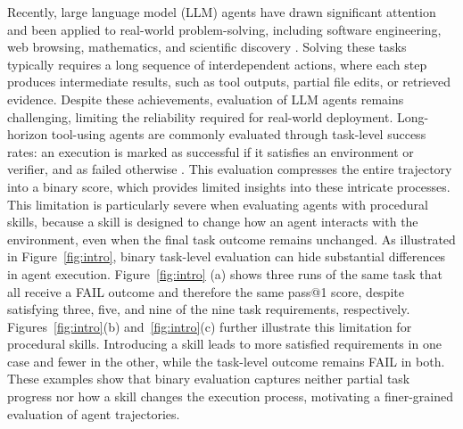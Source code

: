 \documentclass[sigconf,nonacm]{acmart}
\begin{document}
Recently, large language model (LLM) agents have drawn significant attention and been applied to real-world problem-solving, including software engineering, web browsing, mathematics, and scientific discovery \citep{kapoor2026holistic,mohammadi2025evaluation}. Solving these tasks typically requires a long sequence of interdependent actions, where each step produces intermediate results, such as tool outputs, partial file edits, or retrieved evidence. Despite these achievements, evaluation of LLM agents remains challenging, limiting the reliability required for real-world deployment. Long-horizon tool-using agents are commonly evaluated through task-level success rates: an execution is marked as successful if it satisfies an environment or verifier, and as failed otherwise \citep{ma2024agentboard,yao2025taubench,li2026skillsbench}. This evaluation compresses the entire trajectory into a binary score, which provides limited insights into these intricate processes.  This limitation is particularly severe when evaluating agents with procedural skills, because a skill is designed to change how an agent interacts with the environment, even when the final task outcome remains unchanged. As illustrated in Figure~\ref{fig:intro}, binary task-level evaluation can hide substantial differences in agent execution. Figure~\ref{fig:intro} (a) shows three runs of the same task that all receive a FAIL outcome and therefore the same pass@1 score, despite satisfying three, five, and nine of the nine task requirements, respectively. Figures~\ref{fig:intro}(b) and~\ref{fig:intro}(c) further illustrate this limitation for procedural skills. Introducing a skill leads to more satisfied requirements in one case and fewer in the other, while the task-level outcome remains FAIL in both. These examples show that binary evaluation captures neither partial task progress nor how a skill changes the execution process, motivating a finer-grained evaluation of agent trajectories.
\end{document}
